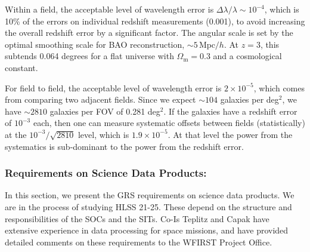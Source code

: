  Within a field, the acceptable level of wavelength error is
 $\Delta\lambda/\lambda \sim 10^{-4}$, which
 is 10\% of the errors on individual redshift measurements (0.001), to avoid
 increasing the overall redshift error by a significant factor. The angular scale
 is set by the optimal smoothing scale for BAO reconstruction, $\sim 5 \,
 \mathrm{Mpc}/h$. At $z=3$, this subtends 0.064 degrees for a flat universe with
 $\Omega_\mathrm{m}=0.3$ and a cosmological constant.

 For field to field, the acceptable level of wavelength error is $2\times10^{-5}$, which comes from comparing two adjacent fields.  Since we expect $\sim 104$ galaxies per deg$^2$, we have $\sim 2810$ galaxies per FOV of 0.281 deg$^2$.  If the galaxies have a redshift error of $10^{-3}$ each, then one can measure systematic offsets between fields (statistically) at the $10^{-3}/\sqrt{2810}$ level, which is $1.9\times10^{-5}$. At that level the power from the systematics is sub-dominant to the power from the redshift error.

 \subsubsection{Requirements on Science Data Products:} In this section, we present the GRS requirements on science data products. We are in the process of studying HLSS 21-25. These depend on the structure and responsibilities of the SOCs and the SITs. Co-Is Teplitz and Capak have extensive experience in data processing for space missions, and have provided detailed comments on these requirements to the WFIRST Project Office.



